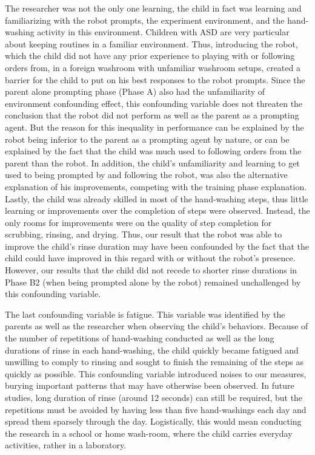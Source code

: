 The researcher was not the only one learning, the child in fact was learning and familiarizing with the robot prompts, the experiment environment, and the hand-washing activity in this environment.  Children with ASD are very particular about keeping routines in a familiar environment.  Thus, introducing the robot, which the child did not have any prior experience to playing with or following orders from, in a foreign washroom with unfamiliar washroom setups, created a barrier for the child to put on his best responses to the robot prompts.  Since the parent alone prompting phase (Phase A) also had the unfamiliarity of environment confounding effect, this confounding variable does not threaten the conclusion that the robot did not perform as well as the parent as a prompting agent.  But the reason for this inequality in performance can be explained by the robot being inferior to the parent as a prompting agent by nature, or can be explained by the fact that the child was much used to following orders from the parent than the robot.  In addition, the child's unfamiliarity and learning to get used to being prompted by and following the robot, was also the alternative explanation of his improvements, competing with the training phase explanation.  Lastly, the child was already skilled in most of the hand-washing steps, thus little learning or improvements over the completion of steps were observed.  Instead, the only rooms for improvements were on the quality of step completion for scrubbing, rinsing, and drying.  Thus, our result that the robot was able to improve the child's rinse duration may have been confounded by the fact that the child could have improved in this regard with or without the robot's presence.  However, our results that the child did not recede to shorter rinse durations in Phase B2 (when being prompted alone by the robot) remained unchallenged by this confounding variable.

The last confounding variable is fatigue.  This variable was identified by the parents as well as the researcher when observing the child's behaviors.  Because of the number of repetitions of hand-washing conducted as well as the long durations of rinse in each hand-washing, the child quickly became fatigued and unwilling to comply to rinsing and sought to finish the remaining of the steps as quickly as possible.  This confounding variable introduced noises to our measures, burying important patterns that may have otherwise been observed.  In future studies, long duration of rinse (around 12 seconds) can still be required, but the repetitions must be avoided by having less than five hand-washings each day and spread them sparsely through the day.  Logistically, this would mean conducting the research in a school or home wash-room, where the child carries everyday activities, rather in a laboratory.

